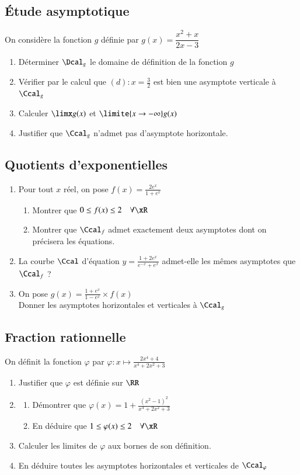 \documentclass[oneside,12pt]{article}          %
\begin{document}
\subsection{Étude asymptotique}
On considère la fonction $g$ définie par $g(x)=\dfrac{x^2+x}{2x-3}$
\begin{enumerate}
    \item Déterminer $\Dcal_g$ le domaine de définition de la fonction $g$
    \item Vérifier par le calcul que $(d):x=\frac{3}{2}$ est bien une asymptote verticale à $\Ccal_g$
    \item Calculer $\limx g(x)$ et $\limite{x\to-\infty}g(x)$
    \item Justifier que $\Ccal_g$ n'admet pas d'asymptote horizontale.
\end{enumerate}



\subsection{Quotients d'exponentielles}
\begin{enumerate}
    \item Pour tout $x$ réel, on pose $f(x)=\frac{2e^x}{1+e^x}$
    \begin{enumerate}
    	\item Montrer que $0\leq f(x) \leq 2 \quad \forall\xR$
    	\item Montrer que $\Ccal_f$ admet exactement deux asymptotes dont on précisera les équations.
    \end{enumerate}
    \item La courbe $\Ccal$ d'équation $y=\frac{1+2e^x}{e^{-x}+e^x}$ admet-elle les mêmes asymptotes que $\Ccal_f$ ?
    \item On pose $g(x)=\frac{1+e^x}{1-e^x}\times f(x)$\\
    Donner les asymptotes horizontales et verticales à $\Ccal_g$
\end{enumerate}



\subsection{Fraction rationnelle}
On définit la fonction $\varphi$ par $\varphi:x\mapsto\frac{2x^4+4}{x^4+2x^2+3}$
\begin{enumerate}
	\item Justifier que $\varphi$ est définie sur $\RR$
	\item \begin{enumerate}
		\item Démontrer que $\varphi(x)=1+\frac{(x^2-1)^2}{x^4+2x^2+3}$
		\item En déduire que $1 \leq \varphi(x) \leq 2 \quad \forall\xR$
	\end{enumerate}
	\item Calculer les limites de $\varphi$ aux bornes de son définition.
	\item En déduire toutes les asymptotes horizontales et verticales de $\Ccal_\varphi$
\end{enumerate}
\end{document}
